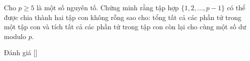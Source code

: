 \ifshowproblem
\begin{problem}\label{problem:RUS-2015-TST-D10-P2}
    Cho \( p \geqslant 5 \) là một số nguyên tố.  
    Chứng minh rằng tập hợp \( \{1, 2, \ldots, p - 1\} \) có thể được chia thành hai tập con không rỗng sao cho:  
    tổng tất cả các phần tử trong một tập con và tích tất cả các phần tử trong tập con còn lại cho cùng một số dư modulo \( p \).
\end{problem}
\fi

\ifshowinfo
Đánh giá [\textbf{}]\footnotemark
{}
\fi